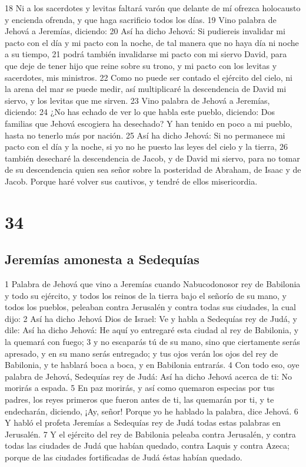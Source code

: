 18 Ni a los sacerdotes y levitas faltará varón que delante de mí ofrezca holocausto y encienda ofrenda, y que haga sacrificio todos los días. 
19 Vino palabra de Jehová a Jeremías, diciendo:
20 Así ha dicho Jehová: Si pudiereis invalidar mi pacto con el día y mi pacto con la noche, de tal manera que no haya día ni noche a su tiempo,
21 podrá también invalidarse mi pacto con mi siervo David, para que deje de tener hijo que reine sobre su trono, y mi pacto con los levitas y sacerdotes, mis ministros.
22 Como no puede ser contado el ejército del cielo, ni la arena del mar se puede medir, así multiplicaré la descendencia de David mi siervo, y los levitas que me sirven.
23 Vino palabra de Jehová a Jeremías, diciendo:
24 ¿No has echado de ver lo que habla este pueblo, diciendo: Dos familias que Jehová escogiera ha desechado? Y han tenido en poco a mi pueblo, hasta no tenerlo más por nación.
25 Así ha dicho Jehová: Si no permanece mi pacto con el día y la noche, si yo no he puesto las leyes del cielo y la tierra,
26 también desecharé la descendencia de Jacob, y de David mi siervo, para no tomar de su descendencia quien sea señor sobre la posteridad de Abraham, de Isaac y de Jacob. Porque haré volver sus cautivos, y tendré de ellos misericordia.

\chapter{34}

\section*{Jeremías amonesta a Sedequías}

1 Palabra de Jehová que vino a Jeremías cuando Nabucodonosor rey de Babilonia y todo su ejército, y todos los reinos de la tierra bajo el señorío de su mano, y todos los pueblos, peleaban contra Jerusalén y contra todas sus ciudades, la cual dijo:
2 Así ha dicho Jehová Dios de Israel: Ve y habla a Sedequías rey de Judá, y dile: Así ha dicho Jehová: He aquí yo entregaré esta ciudad al rey de Babilonia, y la quemará con fuego;
3 y no escaparás tú de su mano, sino que ciertamente serás apresado, y en su mano serás entregado; y tus ojos verán los ojos del rey de Babilonia, y te hablará boca a boca, y en Babilonia entrarás.
4 Con todo eso, oye palabra de Jehová, Sedequías rey de Judá: Así ha dicho Jehová acerca de ti: No morirás a espada.
5 En paz morirás, y así como quemaron especias por tus padres, los reyes primeros que fueron antes de ti, las quemarán por ti, y te endecharán, diciendo, ¡Ay, señor! Porque yo he hablado la palabra, dice Jehová.
6 Y habló el profeta Jeremías a Sedequías rey de Judá todas estas palabras en Jerusalén.
7 Y el ejército del rey de Babilonia peleaba contra Jerusalén, y contra todas las ciudades de Judá que habían quedado, contra Laquis y contra Azeca; porque de las ciudades fortificadas de Judá éstas habían quedado.

